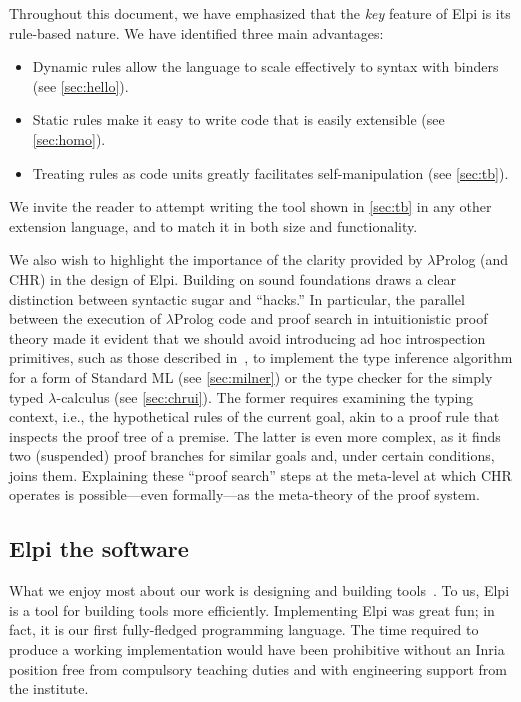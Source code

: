 \documentclass[a4paper, 11pt]{book}
\begin{document}
Throughout this document, we have emphasized that the \emph{key} feature of Elpi
is its rule-based nature. We have identified three main advantages:
\begin{itemize}
\item Dynamic rules allow the language to scale effectively to syntax with binders (see \cref{sec:hello}).
\item Static rules make it easy to write code that is easily extensible (see \cref{sec:homo}).
\item Treating rules as code units greatly facilitates self-manipulation (see \cref{sec:tb}).
\end{itemize}

We invite the reader to attempt writing the  tool shown in
\cref{sec:tb} in any other extension language, and to match it in both
size and functionality.

We also wish to highlight the importance of the clarity provided by
$\lambda$Prolog (and CHR) in the design of Elpi. Building on sound foundations
draws a clear distinction between syntactic sugar and ``hacks.'' In particular,
the parallel between the execution of $\lambda$Prolog code and proof search in
intuitionistic proof theory made it evident that we should avoid introducing ad
hoc introspection primitives, such as those described in~\cite[Section 8 and
later]{10.1145/3236788}, to implement the type inference algorithm for a form
of Standard ML (see \cref{sec:milner}) or the type checker for the
simply typed $\lambda$-calculus (see \cref{sec:chrui}). The former
requires examining the typing context, i.e., the hypothetical rules of the
current goal, akin to a proof rule that inspects the proof tree of a premise.
The latter is even more complex, as it finds two (suspended) proof branches for
similar goals and, under certain conditions, joins them. Explaining these
``proof search'' steps at the meta-level at which CHR operates is possible—even
formally—as the meta-theory of the proof system.


\subsection{Elpi the software}


What we enjoy most about our work is designing and building tools~\cite{DBLP:journals/jar/AspertiCTZ07,gonthier:inria-00258384,Coq-refman}.
To us, Elpi is a tool for building tools more efficiently. Implementing Elpi was great fun; in fact, it is our first fully-fledged programming language. The time required to produce a working implementation would have been prohibitive without an Inria position free from compulsory teaching duties and with engineering support from the institute. %
\end{document}

